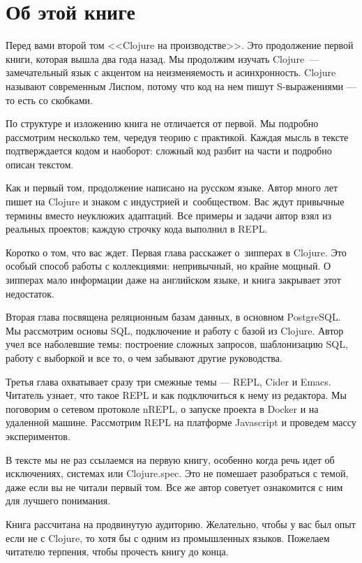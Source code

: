 
\section*{Об этой книге}

Перед вами второй том <<Clojure на производстве>>. Это продолжение первой книги,
которая вышла два года назад. Мы продолжим изучать Clojure~--- замечательный язык
с акцентом на неизменяемость и асинхронность. Clojure называют современным
Лиспом, потому что код на нем пишут S-выражениями — то есть со скобками.

По структуре и изложению книга не отличается от первой. Мы подробно рассмотрим
несколько тем, чередуя теорию с практикой. Каждая мысль в тексте подтверждается
кодом и наоборот: сложный код разбит на части и подробно описан текстом.

Как и первый том, продолжение написано на русском языке. Автор много лет пишет
на Clojure и знаком с индустрией и~сообществом. Вас ждут привычные термины
вместо неуклюжих адаптаций. Все примеры и задачи автор взял из реальных
проектов; каждую строчку кода выполнил в REPL.

Коротко о том, что вас ждет. Первая глава расскажет о~зипперах в Clojure. Это
особый способ работы с коллекциями: непривычный, но крайне мощный. О зипперах
мало информации даже на английском языке, и книга закрывает этот недостаток.

Вторая глава посвящена реляционным базам данных, в основном PostgreSQL. Мы
рассмотрим основы SQL, подключение и работу с базой из Clojure. Автор учел все
наболевшие темы: построение сложных запросов, шаблонизацию SQL, работу с
выборкой и все то, о чем забывают другие руководства.

Третья глава охватывает сразу три смежные темы — REPL, Cider и Emacs. Читатель
узнает, что такое REPL и как подключиться к нему из редактора. Мы поговорим о
сетевом протоколе nREPL, о запуске проекта в Docker и на удаленной
машине. Рассмотрим REPL на платформе Javascript и проведем массу экспериментов.

В тексте мы не раз ссылаемся на первую книгу, особенно когда речь идет об
исключениях, системах или Clojure.spec. Это не помешает разобраться с темой,
даже если вы не читали первый том. Все же автор советует ознакомится с ним для
лучшего понимания.

Книга рассчитана на продвинутую аудиторию. Желательно, чтобы у вас был опыт если
не с Clojure, то хотя бы с одним из промышленных языков. Пожелаем читателю
терпения, чтобы прочесть книгу до конца.

